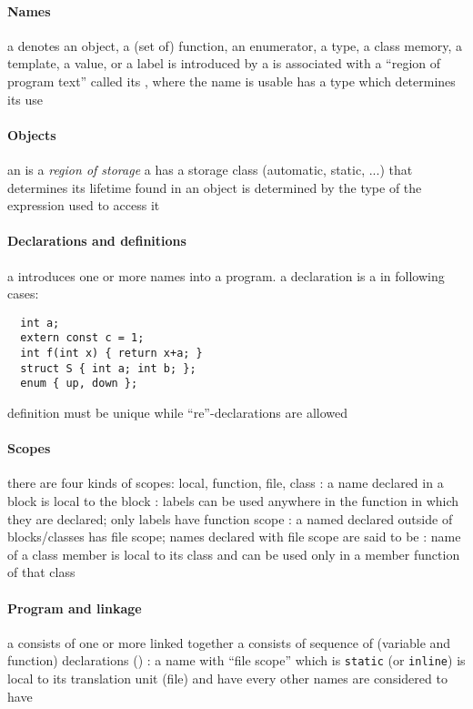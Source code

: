\documentclass{memo}
\begin{document}
\small

\paragraph{Names}
\bit
\w a  denotes an object, a (set of) function, an
enumerator, a type, a class memory, a template, a value, or a label
\w {} is introduced by a 
\w {} is associated with a ``region of program text'' called its
, where the name is usable
\w {} has a type which determines its use
\eit

\paragraph{Objects}
\bit
\w an  is a {\em region of storage}
\w a  has a storage class (automatic, static, ...) that
determines its lifetime
\w {} found in an object is determined by the type of the
expression used to access it
\eit

\paragraph{Declarations and definitions}
\bit
\w  a  introduces one or more names into a program.
\w a declaration is a  in following cases:
  \begin{verbatim}
  int a;
  extern const c = 1;
  int f(int x) { return x+a; }
  struct S { int a; int b; };
  enum { up, down };
  \end{verbatim}
\w definition must be unique while ``re''-declarations are allowed
\eit

\paragraph{Scopes}
\bit
\w there are four kinds of scopes: local, function, file, class
\w {}: a name declared in a block is local to the block
\w {}: labels can be used anywhere in the function in which they
are declared; only labels have function scope
\w {}: a named declared outside of blocks/classes has file scope; names
declared with file scope are said to be 
\w {}: name of a class member is local to its class and can be used
only in a member function of that class
\eit

\paragraph{Program and linkage}
\bit
\w a  consists of one or more  linked together
\w a  consists of sequence of (variable and function) declarations
()
\w {}:
  \bit
  \w a name with ``file scope'' which is {\tt static} (or {\tt inline}) is
  local to its translation unit (file) and have  
  \w every other names are considered to have 
  \eit
\w {}
\eit
\end{document}
